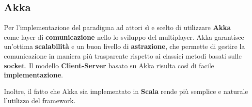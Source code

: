     \subsection{Akka} 
        Per l'implementazione del paradigma ad attori sì e scelto di utilizzare \textbf{Akka} come layer di \textbf{comunicazione} nello lo sviluppo del multiplayer. Akka garantisce un'ottima \textbf{scalabilità} e un buon livello di \textbf{astrazione}, che permette di gestire la comunicazione in maniera più trasparente rispetto ai classici metodi basati sulle \textbf{socket}. Il modello \textbf{Client-Server} basato su Akka risulta così di facile \textbf{implementazione}.
        
        Inoltre, il fatto che Akka sia implementato in \textbf{Scala} rende più semplice e naturale l'utilizzo del framework. 